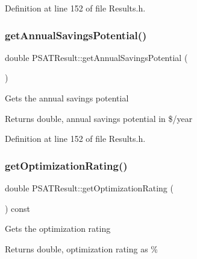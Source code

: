 Definition at line 152 of file Results.\+h.

\mbox{\label{class_p_s_a_t_result_ab318975db5ccdb0b7786e09a3fdff06b}} 
\subsubsection{\texorpdfstring{get\+Annual\+Savings\+Potential()}{getAnnualSavingsPotential()}\hspace{0.1cm}{\footnotesize\ttfamily [3/3]}}
{\footnotesize\ttfamily double P\+S\+A\+T\+Result\+::get\+Annual\+Savings\+Potential (\begin{DoxyParamCaption}{ }\end{DoxyParamCaption})\hspace{0.3cm}{\ttfamily [inline]}}

Gets the annual savings potential \begin{DoxyReturn}{Returns}
double, annual savings potential in \$/year 
\end{DoxyReturn}


Definition at line 152 of file Results.\+h.

\mbox{\label{class_p_s_a_t_result_aa0a7001461408fcb06a6c22ce2d064db}} 
\subsubsection{\texorpdfstring{get\+Optimization\+Rating()}{getOptimizationRating()}\hspace{0.1cm}{\footnotesize\ttfamily [1/3]}}
{\footnotesize\ttfamily double P\+S\+A\+T\+Result\+::get\+Optimization\+Rating (\begin{DoxyParamCaption}{ }\end{DoxyParamCaption}) const\hspace{0.3cm}{\ttfamily [inline]}}

Gets the optimization rating \begin{DoxyReturn}{Returns}
double, optimization rating as \% 
\end{DoxyReturn}


